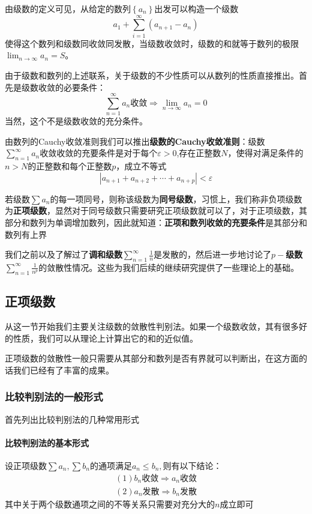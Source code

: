 \documentclass[lang=cn,10pt]{elegantbook}
\begin{document}
由级数的定义可见，从给定的数列$\left\{ a_n \right\} $出发可以构造一个级数
\begin{equation*}
	a_1+\sum_{i=1}^{\infty}{\left( a_{n+1}-a_n \right)}
\end{equation*}
使得这个数列和级数同收敛同发散，当级数收敛时，级数的和就等于数列的极限$\lim_{n\rightarrow \infty} a_n=S$。

由于级数和数列的上述联系，关于级数的不少性质可以从数列的性质直接推出。首先是级数收敛的必要条件：
\begin{equation*}
	\sum_{n=1}^{\infty}{a_n}\text{收敛}\Rightarrow \lim_{n\rightarrow \infty} a_n=0
\end{equation*}
当然，这个不是级数收敛的充分条件。

由数列的Cauchy收敛准则我们可以推出\textbf{级数的Cauchy收敛准则}：级数$\sum_{n=1}^{\infty}{a_n}\text{收敛}$收敛的充要条件是对于每个$\varepsilon >0$,存在正整数$N$，使得对满足条件的$n>N$的正整数和每个正整数$p$，成立不等式
\begin{equation*}
	|a_{n+1}+a_{n+2}+\cdots +a_{n+p}|<\varepsilon
\end{equation*}

若级数$\sum{a_n}$的每一项同号，则称该级数为\textbf{同号级数}，习惯上，我们称非负项级数为\textbf{正项级数}，显然对于同号级数只需要研究正项级数就可以了，对于正项级数，其部分和数列为单调增加数列，因此就知道：\textbf{正项和数列收敛的充要条件}是其部分和数列有上界

我们之前以及了解过了\textbf{调和级数}$\sum_{n=1}^{\infty}{\frac{1}{n}}$是发散的，然后进一步地讨论了$p-$\textbf{级数}$\sum_{n=1}^{\infty}{\frac{1}{n^p}}$的敛散性情况。这些为我们后续的继续研究提供了一些理论上的基础。
\subsection{正项级数}
从这一节开始我们主要关注级数的敛散性判别法。如果一个级数收敛，其有很多好的性质，我们可以从理论上计算出它的和的近似值。

正项级数的敛散性一般只需要从其部分和数列是否有界就可以判断出，在这方面的话我们已经有了丰富的成果。
\subsubsection{比较判别法的一般形式}
首先列出比较判别法的几种常用形式
\paragraph{比较判别法的基本形式}
设正项级数$\sum{a_n},\sum{b_n}\text{的通项满足}a_n\le b_n,\text{则有以下结论}$：
\begin{equation*}
	\begin{split}
		\left( 1 \right) b_n\text{收敛}\Rightarrow a_n\text{收敛}
		\\
		\left( 2 \right) a_n\text{发散}\Rightarrow b_n\text{发散}
	\end{split}
\end{equation*}
其中关于两个级数通项之间的不等关系只需要对充分大的$n$成立即可
\end{document}
